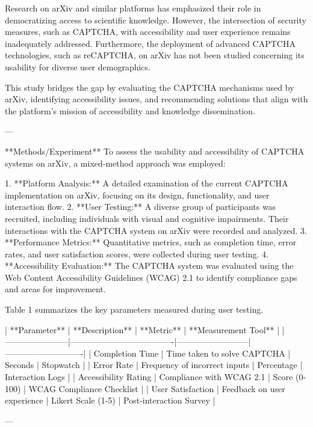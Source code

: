 Research on arXiv and similar platforms has emphasized their role in democratizing access to scientific knowledge. However, the intersection of security measures, such as CAPTCHA, with accessibility and user experience remains inadequately addressed. Furthermore, the deployment of advanced CAPTCHA technologies, such as reCAPTCHA, on arXiv has not been studied concerning its usability for diverse user demographics.

This study bridges the gap by evaluating the CAPTCHA mechanisms used by arXiv, identifying accessibility issues, and recommending solutions that align with the platform's mission of accessibility and knowledge dissemination.

---

**Methods/Experiment**  
To assess the usability and accessibility of CAPTCHA systems on arXiv, a mixed-method approach was employed:  

1. **Platform Analysis:** A detailed examination of the current CAPTCHA implementation on arXiv, focusing on its design, functionality, and user interaction flow.  
2. **User Testing:** A diverse group of participants was recruited, including individuals with visual and cognitive impairments. Their interactions with the CAPTCHA system on arXiv were recorded and analyzed.  
3. **Performance Metrics:** Quantitative metrics, such as completion time, error rates, and user satisfaction scores, were collected during user testing.  
4. **Accessibility Evaluation:** The CAPTCHA system was evaluated using the Web Content Accessibility Guidelines (WCAG) 2.1 to identify compliance gaps and areas for improvement.

Table 1 summarizes the key parameters measured during user testing.

| **Parameter**        | **Description**                     | **Metric**               | **Measurement Tool**       |
|-----------------------|-------------------------------------|--------------------------|----------------------------|
| Completion Time       | Time taken to solve CAPTCHA         | Seconds                  | Stopwatch                  |
| Error Rate            | Frequency of incorrect inputs       | Percentage               | Interaction Logs           |
| Accessibility Rating  | Compliance with WCAG 2.1           | Score (0-100)            | WCAG Compliance Checklist  |
| User Satisfaction     | Feedback on user experience         | Likert Scale (1-5)       | Post-interaction Survey    |

---

